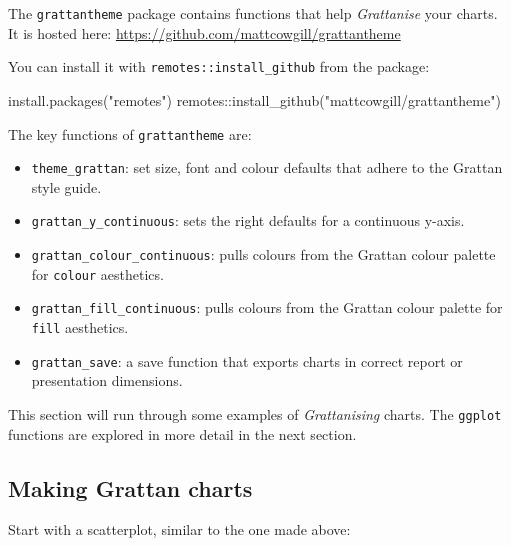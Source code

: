 \documentclass[
]{book}
\newenvironment{Shaded}{\begin{snugshade}}{\end{snugshade}}
\newcommand{\FunctionTok}[1]{\textcolor[rgb]{0.00,0.00,0.00}{#1}}
\newcommand{\NormalTok}[1]{#1}
\newcommand{\SpecialCharTok}[1]{\textcolor[rgb]{0.00,0.00,0.00}{#1}}
\newcommand{\StringTok}[1]{\textcolor[rgb]{0.31,0.60,0.02}{#1}}
\providecommand{\tightlist}{%
  \setlength{\itemsep}{0pt}\setlength{\parskip}{0pt}}
\begin{document}
The \texttt{grattantheme} package contains functions that help \emph{Grattanise} your charts. It is hosted here: \url{https://github.com/mattcowgill/grattantheme}

You can install it with \texttt{remotes::install\_github} from the package:

\begin{Shaded}
\begin{Highlighting}[]
\FunctionTok{install.packages}\NormalTok{(}\StringTok{"remotes"}\NormalTok{)}
\NormalTok{remotes}\SpecialCharTok{::}\FunctionTok{install\_github}\NormalTok{(}\StringTok{"mattcowgill/grattantheme"}\NormalTok{)}
\end{Highlighting}
\end{Shaded}

The key functions of \texttt{grattantheme} are:

\begin{itemize}
\tightlist
\item
  \texttt{theme\_grattan}: set size, font and colour defaults that adhere to the Grattan style guide.
\item
  \texttt{grattan\_y\_continuous}: sets the right defaults for a continuous y-axis.
\item
  \texttt{grattan\_colour\_continuous}: pulls colours from the Grattan colour palette for \texttt{colour} aesthetics.
\item
  \texttt{grattan\_fill\_continuous}: pulls colours from the Grattan colour palette for \texttt{fill} aesthetics.
\item
  \texttt{grattan\_save}: a save function that exports charts in correct report or presentation dimensions.
\end{itemize}

This section will run through some examples of \emph{Grattanising} charts. The \texttt{ggplot} functions are explored in more detail in the next section.

\hypertarget{making-grattan-charts}{%
\subsection{Making Grattan charts}\label{making-grattan-charts}}

Start with a scatterplot, similar to the one made above:
\end{document}
